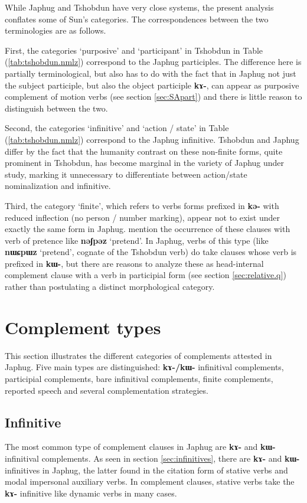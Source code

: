 \documentclass[oneside,a4paper,11pt]{article}
\newcommand{\ipa}[1]{\textbf{\phon#1}} %
\newcommand{\jpg}[2]{\ipa{#1} `#2'} %
\begin{document}
While Japhug and Tshobdun have very close systems, the present analysis conflates some of Sun's categories. The correspondences between the two terminologies are as follows.

First, the categories `purposive' and `participant' in Tshobdun in Table (\ref{tab:tshobdun.nmlz}) correspond to the Japhug participles. The difference here is partially terminological, but also has to do with the fact that in Japhug not just the subject participle, but also the object participle \ipa{kɤ-}, can appear as purposive complement of motion verbs (see section \ref{sec:SApart}) and there is little reason to distinguish between the two.

Second, the categories `infinitive' and `action / state' in Table (\ref{tab:tshobdun.nmlz}) correspond to the Japhug infinitive. Tshobdun and Japhug differ by the fact that the humanity contrast on these non-finite forms, quite prominent in Tshobdun, has become marginal in the variety of Japhug under study, marking it unnecessary to differentiate between action/state nominalization and infinitive.

Third, the category `finite', which refers to verbs forms prefixed in \ipa{kə-} with reduced inflection (no person / number marking), appear not to exist under exactly the same form in Japhug. \citet[481]{sun12complementation} mention the occurrence of these clauses with verb of pretence like \jpg{nəʃpəz}{pretend}. In Japhug, verbs of this type (like \jpg{nɯɕpɯz}{pretend}, cognate of the Tshobdun verb) do take clauses whose verb is prefixed in \ipa{kɯ-}, but there are reasons to analyze these as head-internal complement clause with a verb in participial form (see section \ref{sec:relative.q}) rather than postulating a distinct morphological category.


 
\section{Complement types} \label{sec:complement.types}
This section illustrates the different categories of complements attested in Japhug. Five main types are distinguished: \ipa{kɤ-/kɯ-} infinitival complements, participial complements, bare infinitival complements, finite complements, reported speech and several complementation strategies.

\subsection{Infinitive} \label{sec:infinitives.compl}
The most common type of complement clauses in Japhug are \ipa{kɤ-} and \ipa{kɯ-} infinitival complements. As seen in section \ref{sec:infinitives}, there are \ipa{kɤ-} and \ipa{kɯ-} infinitives in Japhug, the latter found in the citation form of stative verbs and modal impersonal auxiliary verbs. In complement clauses, stative verbs take the \ipa{kɤ-} infinitive like dynamic verbs in many cases.
\end{document}
